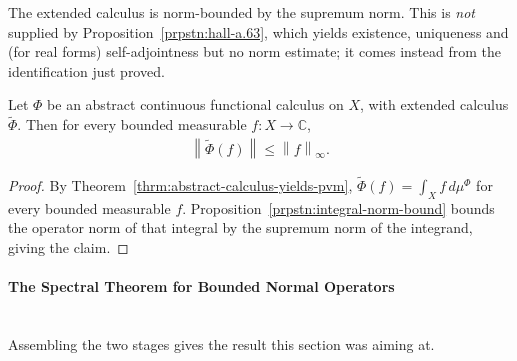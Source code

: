 The extended calculus is norm-bounded by the supremum norm. This is \textit{not} supplied by Proposition~\ref{prpstn:hall-a.63}, which yields existence, uniqueness and (for real forms) self-adjointness but no norm estimate; it comes instead from the identification just proved.

\begin{corollary}
    \label{crllr:abstract-extended-norm-bound}
    \leanok
    Let $\Phi$ be an abstract continuous functional calculus on $X$, with extended calculus $\widetilde\Phi$. Then for every bounded measurable $f : X \to \mathbb{C}$,
    \begin{align}
        \left\| \widetilde\Phi(f) \right\| \le \left\| f \right\|_\infty.
    \end{align}
\end{corollary}
\begin{proof}
    \leanok
By Theorem~\ref{thrm:abstract-calculus-yields-pvm}, $\widetilde\Phi(f) = \int_X f \, d\mu^\Phi$ for every bounded measurable $f$. Proposition~\ref{prpstn:integral-norm-bound} bounds the operator norm of that integral by the supremum norm of the integrand, giving the claim.
\end{proof}

\paragraph{The Spectral Theorem for Bounded Normal Operators}\mbox{}\\
Assembling the two stages gives the result this section was aiming at.

